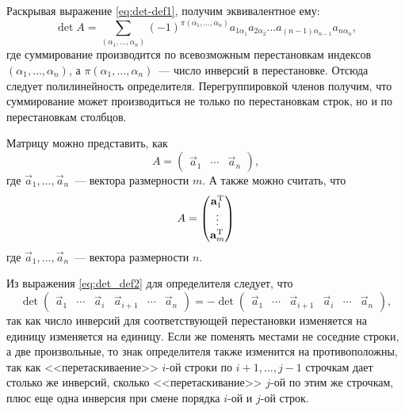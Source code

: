    Раскрывая выражение \eqref{eq:det-def1}, получим эквивалентное ему:
    \begin{equation}
        \det A = \sum\limits_{(\alpha_1, \ldots, \alpha_n)} (-1)^{\pi(\alpha_1, \ldots, \alpha_n)} a_{1\alpha_1} a_{2\alpha_2} \ldots a_{(n-1)\alpha_{n-1}} a_{n\alpha_n},
        \label{eq:det_def2}
    \end{equation}
    где суммирование производится по всевозможным перестановкам индексов $(\alpha_1, \ldots, \alpha_n)$, а $\pi(\alpha_1, \ldots, \alpha_n)$~--- число инверсий в перестановке. Отсюда следует полилинейность определителя. Перегруппировкой членов получим, что суммирование может производиться не только по перестановкам строк, но и по перестановкам столбцов.

    Матрицу можно представить, как
    \begin{equation}
        A = \begin{pmatrix}
            \vec{a}_1 & \cdots & \vec{a}_n
        \end{pmatrix},
    \end{equation}
    где $\vec{a}_1, \ldots, \vec{a}_n$~--- вектора размерности $m$. А также можно считать, что
    \begin{equation}
        A = \begin{pmatrix}
            \mathbf{a}_1^{\operatorname{T}}\\
            \vdots\\
            \mathbf{a}_m^{\operatorname{T}}
        \end{pmatrix}
    \end{equation}
    где $\vec{a}_1, \ldots, \vec{a}_n$~--- вектора размерности $n$.

    Из выражения \eqref{eq:det_def2} для определителя следует, что
    \begin{equation}
        \det \begin{pmatrix}
            \vec{a}_1 & \cdots & \vec{a}_i & \vec{a}_{i+1} & \cdots & \vec{a}_n
        \end{pmatrix} =
    -\det \begin{pmatrix}
            \vec{a}_1 & \cdots & \vec{a}_{i+1} & \vec{a}_i & \cdots & \vec{a}_n
        \end{pmatrix},
    \end{equation}
    так как число инверсий для соответствующей перестановки изменяется на единицу изменяется на единицу. Если же поменять местами не соседние строки, а две произвольные, то знак определителя также изменится на противоположны, так как <<перетаскиваение>> $i$-ой строки по $i+1, \ldots, j - 1$ строчкам дает столько же инверсий, сколько <<перетаскивание>> $j$-ой по этим же строчкам, плюс еще одна инверсия при смене порядка $i$-ой и $j$-ой строк.

